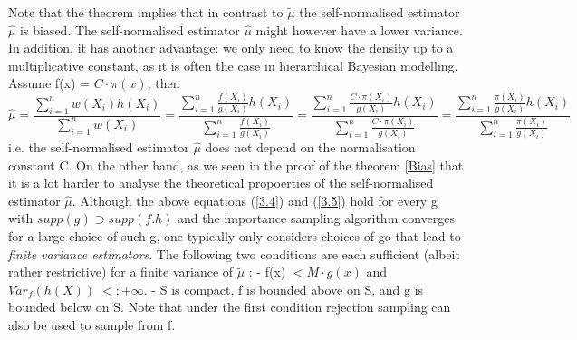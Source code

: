 \documentclass[a4paper,10pt]{article}
\newcommand{\lt}{<}
\begin{document}
Note that the theorem implies that in contrast to $\tilde{\mu}$ the self-normalised estimator $\hat{\mu}$ is biased.
The self-normalised estimator $\hat{\mu}$ might however have a lower variance. In addition, it has another advantage: 
we only need to know the density up to a multiplicative constant, as it is often the case in hierarchical Bayesian
modelling. Assume f(x) = $C \cdot \pi(x)$, then 
\begin{equation*}
 \hat{\mu} = \dfrac{\sum_{i=1}^{n}w(X_i)h(X_i)}{\sum_{i=1}^{n}w(X_{i})} =\dfrac{\sum_{i=1}^{n} \frac{f(X_i)}{g(X_i)}h(X_i)}{\sum_{i=1}^{n}\frac{f(X_i)}{g(X_i)}}
= \dfrac{\sum_{i=1}^{n} \frac{C\cdot \pi(X_i)}{g(X_i)}h(X_i)}{\sum_{i=1}^{n}\frac{C\cdot \pi(X_i)}{g(X_i)}}
=  \dfrac{\sum_{i=1}^{n} \frac{\pi(X_i)}{g(X_i)}h(X_i)}{\sum_{i=1}^{n}\frac{\pi(X_i)}{g(X_i)}}
 \end{equation*}
i.e. the self-normalised estimator $\hat{\mu}$ does not depend on the normalisation constant C.
On the other hand, as we seen in the proof of the theorem \ref{Bias} that it is a lot harder to analyse the 
theoretical propoerties of the self-normalised estimator $\hat{\mu}.$
   Although the above equations (\ref{3.4}) and (\ref{3.5}) hold for every g with $supp(g)\supset supp(f.h)$ and the 
   importance sampling algorithm converges for a large choice of such g, one typically only considers choices
   of go that lead to \textit{finite variance estimators}.
   The following two conditions are each sufficient (albeit rather restrictive) for a finite variance of $\tilde{\mu}$
:
- f(x) $\lt M\cdot g(x)$ and $Var_{f}(h(X)) \; \lt; + \infty.$
- S is compact, f is bounded above on S, and g is bounded below on S. 
Note that under the first condition rejection sampling can also be used to sample from f. 
   
\end{document}
